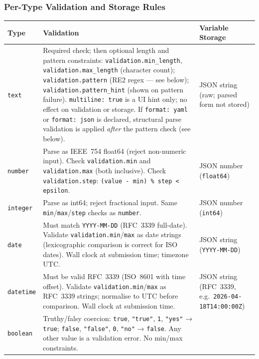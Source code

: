 \subsubsection*{Per-Type Validation and Storage Rules}

\begin{center}
\small
\begin{tabular}{|l|p{5.0cm}|p{3.6cm}|}
\hline
\textbf{Type} & \textbf{Validation} & \textbf{Variable Storage} \\
\hline
\texttt{text}
  & Required check; then optional length and pattern constraints:
    \texttt{validation.min\_length}, \texttt{validation.max\_length} (character
    count); \texttt{validation.pattern} (RE2 regex — see below);
    \texttt{validation.pattern\_hint} (shown on pattern failure).
    \texttt{multiline: true} is a UI hint only; no effect on validation or storage.
    If \texttt{format: yaml} or \texttt{format: json} is declared, structural
    parse validation is applied \emph{after} the pattern check (see below).
  & JSON string (raw; parsed form not stored) \\
\hline
\texttt{number}
  & Parse as IEEE~754 float64 (reject non-numeric input).
    Check \texttt{validation.min} and \texttt{validation.max} (both inclusive).
    Check \texttt{validation.step}: \texttt{(value - min) \% step < epsilon}.
  & JSON number (\texttt{float64}) \\
\hline
\texttt{integer}
  & Parse as int64; reject fractional input.
    Same \texttt{min}/\texttt{max}/\texttt{step} checks as \texttt{number}.
  & JSON number (\texttt{int64}) \\
\hline
\texttt{date}
  & Must match \texttt{YYYY-MM-DD} (RFC~3339 full-date).
    Validate \texttt{validation.min}/\texttt{max} as date strings (lexicographic
    comparison is correct for ISO dates).
    Wall clock at submission time; timezone UTC.
  & JSON string (\texttt{YYYY-MM-DD}) \\
\hline
\texttt{datetime}
  & Must be valid RFC~3339 (ISO~8601 with time offset).
    Validate \texttt{validation.min}/\texttt{max} as RFC~3339 strings; normalise to
    UTC before comparison.
    Wall clock at submission time.
  & JSON string (RFC~3339, e.g.\ \texttt{2026-04-18T14:00:00Z}) \\
\hline
\texttt{boolean}
  & Truthy/falsy coercion:
    \texttt{true}, \texttt{"true"}, \texttt{1}, \texttt{"yes"} → \texttt{true};
    \texttt{false}, \texttt{"false"}, \texttt{0}, \texttt{"no"} → \texttt{false}.
    Any other value is a validation error.  No min/max constraints.

\end{tabular}
\end{center}
